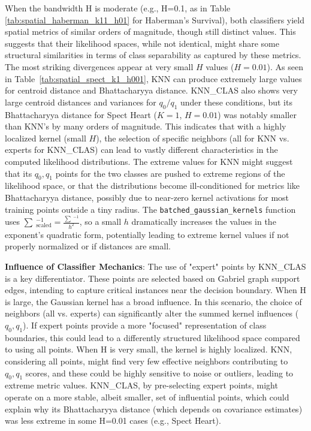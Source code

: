 \documentclass[conference]{IEEEtran}
\begin{document}
When the bandwidth H is moderate (e.g., H=0.1, as in Table \ref{tab:spatial_haberman_k11_h01} for Haberman's Survival), both classifiers yield spatial metrics of similar orders of magnitude, though still distinct values. This suggests that their likelihood spaces, while not identical, might share some structural similarities in terms of class separability as captured by these metrics.
The most striking divergences appear at very small $H$ values ($H=0.01$)\cite{70, 71}. As seen in Table~\ref{tab:spatial_spect_k1_h001}, KNN can produce extremely large values for centroid distance and Bhattacharyya distance. KNN\_CLAS also shows very large centroid distances and variances for $q_0/q_1$ under these conditions, but its Bhattacharyya distance for Spect Heart ($K=1$, $H=0.01$) was notably smaller than KNN's by many orders of magnitude. This indicates that with a highly localized kernel (small $H$), the selection of specific neighbors (all for KNN vs. experts for KNN\_CLAS) can lead to vastly different characteristics in the computed likelihood distributions. The extreme values for KNN might suggest that its $q_0, q_1$ points for the two classes are pushed to extreme regions of the likelihood space, or that the distributions become ill-conditioned for metrics like Bhattacharyya distance, possibly due to near-zero kernel activations for most training points outside a tiny radius. The \texttt{batched\_gaussian\_kernels} function uses $\sum\ ^{-1}_\text{scaled} = \frac{\sum\ ^{-1}}{h^2}$, so a small $h$ dramatically increases the values in the exponent's quadratic form, potentially leading to extreme kernel values if not properly normalized or if distances are small.      

\textbf{Influence of Classifier Mechanics}:
The use of "expert" points by KNN\_CLAS is a key differentiator. These points are selected based on Gabriel graph support edges, intending to capture critical instances near the decision boundary.
When H is large, the Gaussian kernel has a broad influence. In this scenario, the choice of neighbors (all vs. experts) can significantly alter the summed kernel influences ($q_0, q_1$). If expert points provide a more "focused" representation of class boundaries, this could lead to a differently structured likelihood space compared to using all points.
When H is very small, the kernel is highly localized. KNN, considering all points, might find very few effective neighbors contributing to $q_0, q_1$ scores, and these could be highly sensitive to noise or outliers, leading to extreme metric values. KNN\_CLAS, by pre-selecting expert points, might operate on a more stable, albeit smaller, set of influential points, which could explain why its Bhattacharyya distance (which depends on covariance estimates) was less extreme in some H=0.01 cases (e.g., Spect Heart).
\end{document}

